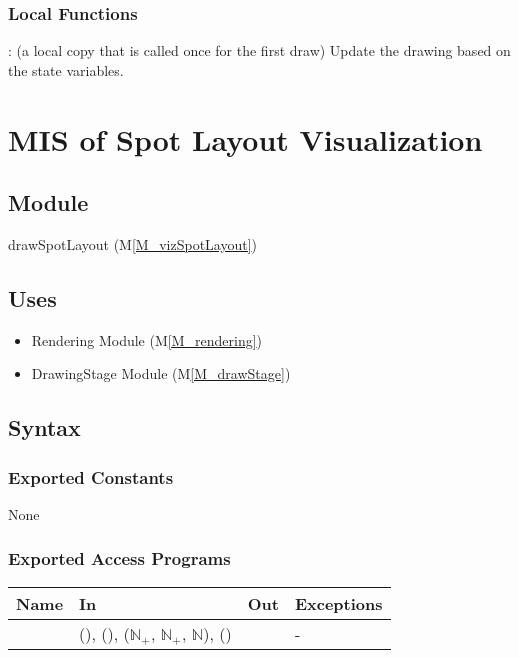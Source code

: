\documentclass[12pt, titlepage]{article}
\newcommand{\mref}[1]{M\ref{#1}}
\newcommand{\mrefp}[1]{(\mref{#1})}
\newcommand{\mreff}[1]{Module \mrefp{#1}}
\begin{document}
\subsubsection{Local Functions}
: (a local copy that is called once for the first draw)
  Update the drawing based on the state variables.

\newpage



\section{MIS of Spot Layout Visualization} \label{MS_vizSpotLayout}

\subsection{Module}
drawSpotLayout \mrefp{M_vizSpotLayout}

\subsection{Uses}
\begin{itemize}
  \item Rendering \mreff{M_rendering}
  \item DrawingStage \mreff{M_drawStage}
\end{itemize}

\subsection{Syntax}

\subsubsection{Exported Constants}
None
\subsubsection{Exported Access Programs}

\begin{center}
\begin{tabular}{L{4cm} L{4cm} L{4cm} L{2cm}}
\hline
\textbf{Name} & \textbf{In} & \textbf{Out} & \textbf{Exceptions} \\
\hline
{} &  (),
   (),
   ($\mathbb{N}_+$, $\mathbb{N}_+$, $\mathbb{N}$),
   ()
  &  & - \\
\hline
\end{tabular}
\end{center}
\end{document}
